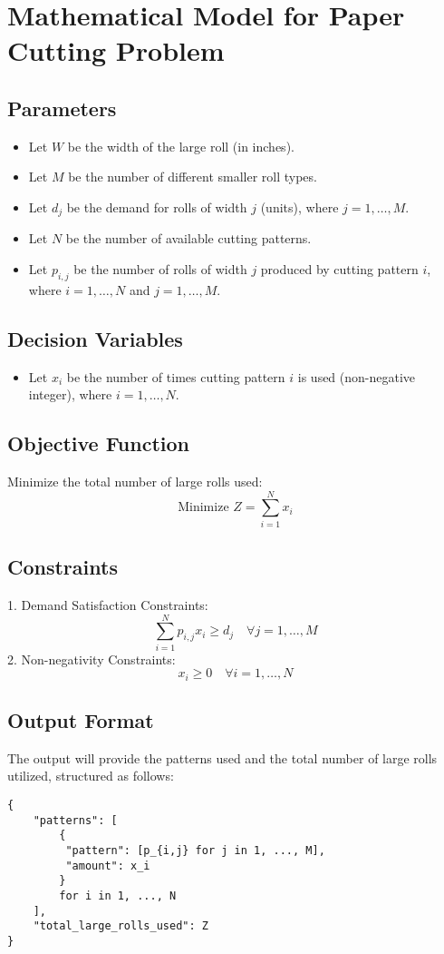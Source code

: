 \documentclass{article}
\begin{document}
\section*{Mathematical Model for Paper Cutting Problem}

\subsection*{Parameters}
\begin{itemize}
    \item Let \( W \) be the width of the large roll (in inches).
    \item Let \( M \) be the number of different smaller roll types.
    \item Let \( d_j \) be the demand for rolls of width \( j \) (units), where \( j = 1, \ldots, M \).
    \item Let \( N \) be the number of available cutting patterns.
    \item Let \( p_{i,j} \) be the number of rolls of width \( j \) produced by cutting pattern \( i \), where \( i = 1, \ldots, N \) and \( j = 1, \ldots, M \).
\end{itemize}

\subsection*{Decision Variables}
\begin{itemize}
    \item Let \( x_i \) be the number of times cutting pattern \( i \) is used (non-negative integer), where \( i = 1, \ldots, N \).
\end{itemize}

\subsection*{Objective Function}
Minimize the total number of large rolls used:
\[
\text{Minimize } Z = \sum_{i=1}^{N} x_i
\]

\subsection*{Constraints}
1. Demand Satisfaction Constraints:
\[
\sum_{i=1}^{N} p_{i,j} x_i \geq d_j \quad \forall j = 1, \ldots, M
\]
2. Non-negativity Constraints:
\[
x_i \geq 0 \quad \forall i = 1, \ldots, N
\]

\subsection*{Output Format}
The output will provide the patterns used and the total number of large rolls utilized, structured as follows:
\begin{verbatim}
{
    "patterns": [
        {
         "pattern": [p_{i,j} for j in 1, ..., M],
         "amount": x_i
        }
        for i in 1, ..., N
    ],
    "total_large_rolls_used": Z
}
\end{verbatim}
\end{document}

